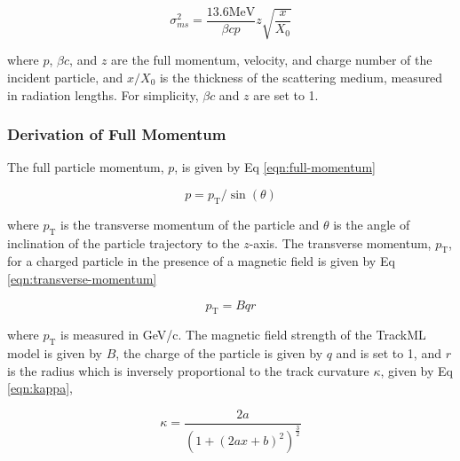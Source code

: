 
\begin{equation}
    \sigma_{ms}^{2} = \frac{13.6 \text{MeV}}{\beta c p} z \sqrt{\frac{x}{X_0}}
    \label{eqn:simplified-moliere-equation}
\end{equation}

where $p$, $\beta c$, and $z$ are the full momentum, velocity, and charge number of the incident particle, and $x/X_0$ is the thickness of the scattering medium, measured in radiation lengths. For simplicity, $\beta c$ and $z$ are set to 1. 




\subsubsection{Derivation of Full Momentum}

The full particle momentum, $p$, is given by Eq \eqref{eqn:full-momentum}

\begin{equation}
    p = p_\text{T} / \sin(\theta)
    \label{eqn:full-momentum}
\end{equation}

where $p_\text{T}$ is the transverse momentum of the particle and $\theta$ is the angle of inclination of the particle trajectory to the $z$-axis. The transverse momentum, $p_\text{T}$, for a charged particle in the presence of a magnetic field is given by Eq \eqref{eqn:transverse-momentum}

\begin{equation}
    p_\text{T} = B q r
    \label{eqn:transverse-momentum}
\end{equation}

where $p_\text{T}$ is measured in GeV/c. The magnetic field strength of the TrackML model is given by $B$, the charge of the particle is given by $q$ and is set to 1, and $r$ is the radius which is inversely proportional to the track curvature $\kappa$, given by Eq \eqref{eqn:kappa}, 

\begin{equation}
\kappa = \frac{2a}{(1 + (2ax + b)^2)^{\frac{3}{2}}}
\label{eqn:kappa}
\end{equation}

